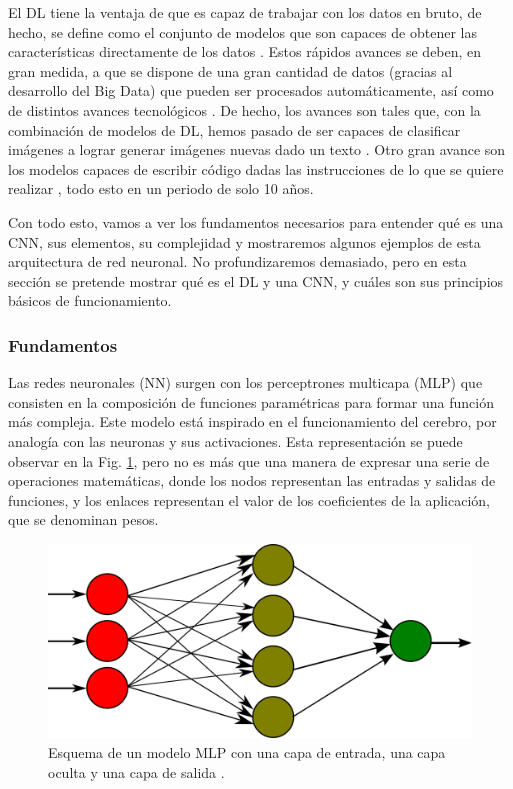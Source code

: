 \documentclass[a4paper,12pt,oneside,titlepage]{book}
\begin{document}
El DL tiene la ventaja de que es capaz de trabajar con los datos en bruto, de hecho, se define como el conjunto de modelos que son capaces de obtener las características directamente de los datos \cite{dl_book}. Estos rápidos avances se deben, en gran medida, a que se dispone de una gran cantidad de datos (gracias al desarrollo del Big Data) que pueden ser procesados automáticamente, así como de distintos avances tecnológicos \cite{korean_dl,dl_nature}. De hecho, los avances son tales que, con la combinación de modelos de DL, hemos pasado de ser capaces de clasificar imágenes a lograr generar imágenes nuevas dado un texto \cite{hier}. Otro gran avance son los modelos capaces de escribir código dadas las instrucciones de lo que se quiere realizar \cite{codex}, todo esto en un periodo de solo 10 años.

Con todo esto, vamos a ver los fundamentos necesarios para entender qué es una CNN, sus elementos, su complejidad y mostraremos algunos ejemplos de esta arquitectura de red neuronal. No profundizaremos demasiado, pero en esta sección se pretende mostrar qué es el DL y una CNN, y cuáles son sus principios básicos de funcionamiento. 

\subsubsection*{Fundamentos}

Las redes neuronales (NN) surgen con los perceptrones multicapa (MLP) que consisten en la composición de funciones paramétricas para formar una función más compleja. Este modelo está inspirado en el funcionamiento del cerebro, por analogía con las neuronas y sus activaciones. Esta representación se puede observar en la Fig. \ref{fig:mlp}, pero no es más que una manera de expresar una serie de operaciones matemáticas, donde los nodos representan las entradas y salidas de funciones, y los enlaces representan el valor de los coeficientes de la aplicación, que se denominan pesos. 
\begin{figure}[h!]
  \centering
  \includegraphics[scale=0.29]{MultiLayerPerceptron.png}
  \caption{Esquema de un modelo MLP con una capa de entrada, una capa oculta y una capa de salida \cite{mlp}.
  }
  \label{fig:mlp}
\end{figure}
\end{document}
